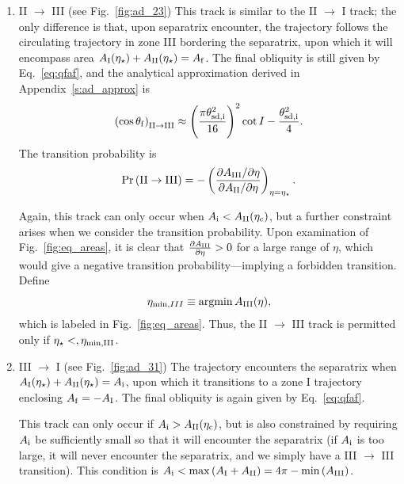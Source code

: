 \documentclass[
        fleqn,
        usenatbib,
    ]{mnras}
\newcommand*{\pd}[2]{\frac{\partial#1}{\partial#2}}
\newcommand*{\pdil}[2]{\partial#1 / \partial#2}
\newcommand*{\p}[1]{\left(#1\right)}
\DeclareMathOperator*{\argmin}{argmin}
\begin{document}
\begin{enumerate}
    \item II $\to$ III (see Fig.~\ref{fig:ad_23}) This track is similar to the
        II $\to$ I track; the only difference is that, upon separatrix
        encounter, the trajectory follows the circulating trajectory in zone III
        bordering the separatrix, upon which it will encompass area $A_{\rm
        I}(\eta_\star) + A_{\rm II}(\eta_\star) = A_{\rm f}$. The final
        obliquity is still given by Eq.~\eqref{eq:qfaf}, and the analytical
        approximation derived in Appendix~\ref{s:ad_approx} is
        \begin{equation}
            \p{\cos \theta_{\rm f}}_{\rm II \to III} \approx
                \p{\frac{\pi \theta_{\rm sd, i}^2}{16}}^2 \cot I
                    - \frac{\theta_{\rm sd, i}^2}{4}.\label{eq:qf_23_approx}
        \end{equation}
        The transition probability is
        \begin{equation}
            \Pr\p{\mathrm{II} \to \mathrm{III}} = -\p{
                \frac{\pdil{A_{\rm III}}{\eta}}{\pdil{A_{\rm II}}{\eta}}}
                    _{\eta = \eta_{\star}}.
        \end{equation}

        Again, this track can only occur when $A_{\rm i} < A_{\rm II}(\eta_{\rm
        c})$, but a further constraint arises when we consider the transition
        probability. Upon examination of Fig.~\ref{fig:eq_areas}, it is clear
        that $\pd{A_{\rm III}}{\eta} > 0$ for a large range of $\eta$, which
        would give a negative transition probability---implying a forbidden
        transition. Define
        \begin{equation}
            \eta_{\min, III} \equiv \argmin A_{\rm III}(\eta)
                \label{eq:eta_minIII},
        \end{equation}
        which is labeled in Fig.~\ref{fig:eq_areas}. Thus, the II $\to$ III
        track is permitted only if $\eta_\star <, \eta_{\rm \min, III}$.

    \item III $\to$ I (see Fig.~\ref{fig:ad_31}) The trajectory encounters the
        separatrix when $A_{\rm I}(\eta_\star) + A_{\rm II}(\eta_\star) =
        A_{\rm i}$, upon which it transitions to a zone I trajectory enclosing
        $A_{\rm f} = -A_{\rm I}$. The final obliquity is again given by
        Eq.~\eqref{eq:qfaf}.

        This track can only occur if $A_{\rm i} > A_{\rm II}(\eta_{\rm c})$,
        but is also constrained by requiring $A_{\rm i}$ be sufficiently small
        so that it will encounter the separatrix (if $A_{\rm i}$ is too large,
        it will never encounter the separatrix, and we simply have a III $\to$
        III transition). This condition is $A_{\rm i} < \max \p{A_{\rm I} +
        A_{\rm II}} = 4\pi - \min \p{A_{\rm III}}$.


\end{enumerate}
\end{document}

